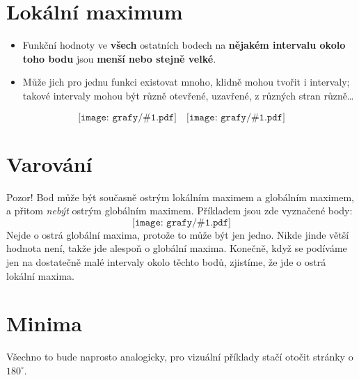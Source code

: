 \documentclass[12pt,a4paper]{article}
\def\graf#1{\texttt{[image: grafy/\#1.pdf]}}
\begin{document}
\section{Lokální maximum}
\begin{itemize}
    \item Funkční hodnoty ve \textbf{všech} ostatních bodech na \textbf{nějakém intervalu okolo toho bodu} jsou \textbf{menší nebo stejně velké}.
    \item Může jich pro jednu funkci existovat mnoho, klidně mohou tvořit i intervaly; takové intervaly mohou být různě otevřené, uzavřené, z různých stran různě\dots
\end{itemize}
\[ \graf{lok_neostre_1}\quad\graf{lok_neostre_2} \]

\section{Varování}
Pozor! Bod může být současně ostrým lokálním maximem a globálním maximem, a přitom \emph{nebýt} ostrým globálním maximem. Příkladem jsou zde vyznačené body:
\[ \graf{warn} \]
Nejde o ostrá globální maxima, protože to může být jen jedno. Nikde jinde větší hodnota není, takže jde alespoň o globální maxima. Konečně, když se podíváme jen na dostatečně malé intervaly okolo těchto bodů, zjistíme, že jde o ostrá lokální maxima.


\section{Minima}

Všechno to bude naprosto analogicky, pro vizuální příklady stačí otočit stránky o $180^\circ$.
\end{document}
